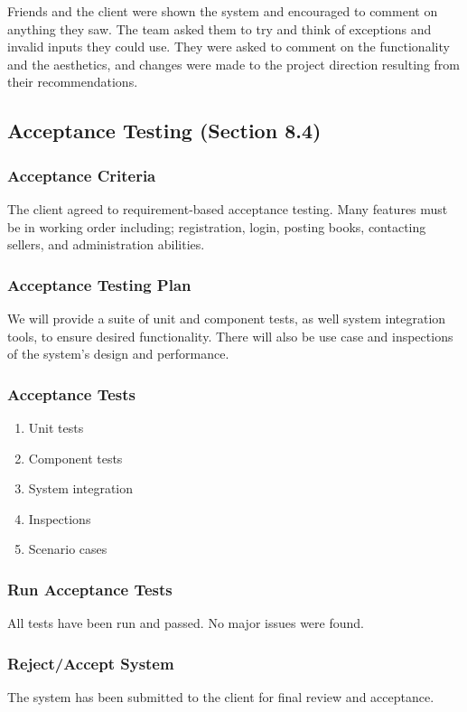 \documentclass[11pt]{article}
\begin{document}
			Friends and the client were shown the system and encouraged to comment on anything they saw. 
			The team asked them to try and think of exceptions and invalid inputs they could use. 
			They were asked to comment on the functionality and the aesthetics, and changes were made to the project direction resulting from their recommendations.

	\subsection{Acceptance Testing (Section 8.4)}

		\subsubsection{Acceptance Criteria}

			The client agreed to requirement-based acceptance testing. 
			Many features must be in working order including; registration, login, posting books, contacting sellers, and administration abilities.

		\subsubsection{Acceptance Testing Plan}

			We will provide a suite of unit and component tests, as well system integration tools, to ensure desired functionality. 
			There will also be use case and inspections of the system's design and performance.

		\subsubsection{Acceptance Tests}
			\begin{enumerate}
				\item Unit tests
				\item Component tests
				\item System integration
				\item Inspections
				\item Scenario cases
			\end{enumerate}

		\subsubsection{Run Acceptance Tests}
			All tests have been run and passed. No major issues were found.

		\subsubsection{Reject/Accept System}
			The system has been submitted to the client for final review and acceptance.
\end{document}
